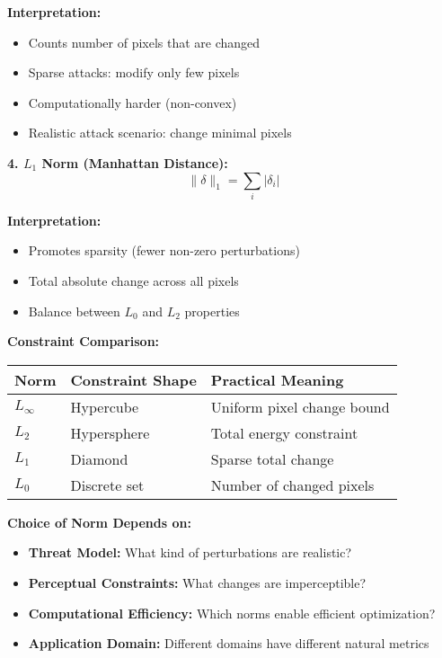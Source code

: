 \documentclass[12pt]{article}
\begin{document}
\begin{enumerate}[(a)]
{    \textbf{Interpretation:}
    \begin{itemize}
        \item Counts number of pixels that are changed
        \item Sparse attacks: modify only few pixels
        \item Computationally harder (non-convex)
        \item Realistic attack scenario: change minimal pixels
    \end{itemize}
    
    \textbf{4. $L_1$ Norm (Manhattan Distance):}
    $$\|\delta\|_1 = \sum_i |\delta_i|$$
    
    \textbf{Interpretation:}
    \begin{itemize}
        \item Promotes sparsity (fewer non-zero perturbations)
        \item Total absolute change across all pixels
        \item Balance between $L_0$ and $L_2$ properties
    \end{itemize}
    
    \textbf{Constraint Comparison:}
    
    \begin{center}
    \begin{tabular}{|l|l|l|}
    \hline
    Norm & Constraint Shape & Practical Meaning \\
    \hline
    $L_\infty$ & Hypercube & Uniform pixel change bound \\
    $L_2$ & Hypersphere & Total energy constraint \\
    $L_1$ & Diamond & Sparse total change \\
    $L_0$ & Discrete set & Number of changed pixels \\
    \hline
    \end{tabular}
    \end{center}
    
    \textbf{Choice of Norm Depends on:}
    \begin{itemize}
        \item \textbf{Threat Model:} What kind of perturbations are realistic?
        \item \textbf{Perceptual Constraints:} What changes are imperceptible?
        \item \textbf{Computational Efficiency:} Which norms enable efficient optimization?
        \item \textbf{Application Domain:} Different domains have different natural metrics
    \end{itemize}
    }
    

\end{enumerate}
\end{document}

